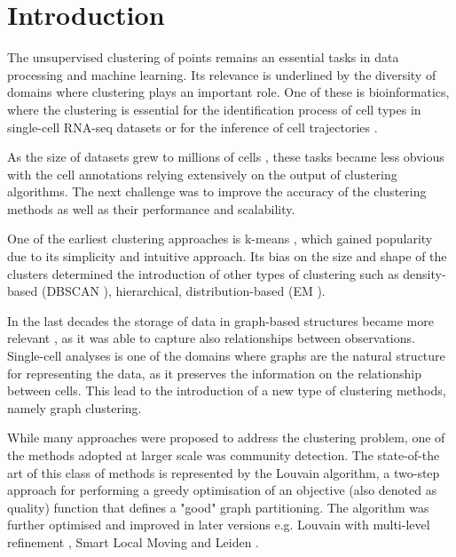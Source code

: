 \chapter*{Introduction} 

The unsupervised clustering of points remains an essential tasks in data processing and machine learning. Its relevance is underlined by the diversity of domains where clustering plays an important role. One of these is bioinformatics, where the clustering is essential for the identification process of cell types \cite{Kiselev2019a} in single-cell RNA-seq datasets or for the inference of cell trajectories \cite{Saelens2019}.

As the size of datasets grew to millions of cells \cite{Svensson2020a}, these tasks became less obvious with the cell annotations relying extensively on the output of clustering algorithms. The next challenge was to improve the accuracy of the clustering methods as well as their performance and scalability.

One of the earliest clustering approaches is k-means \cite{Lloyd1982}, which gained popularity due to its simplicity and intuitive approach. Its bias on the size and shape of the clusters determined the introduction of other types of clustering such as density-based (DBSCAN \cite{ester1996}), hierarchical, distribution-based (EM \cite{Dempster1977}).

In the last decades the storage of data in graph-based structures became more relevant \cite{cook2006mining}, as it was able to capture also relationships between observations. Single-cell analyses is one of the domains where graphs are the natural structure for representing the data, as it preserves the information on the relationship between cells. This lead to the introduction of a new type of clustering methods, namely graph clustering.

While many approaches were proposed to address the clustering problem, one of the methods adopted at larger scale was community detection. The state-of-the art of this class of methods is represented by the Louvain \cite{Blondel2008b} algorithm, a two-step approach for performing a greedy optimisation of an objective (also denoted as quality) function that defines a "good" graph partitioning. The algorithm was further optimised and improved in later versions e.g. Louvain with multi-level refinement \cite{Rotta2011}, Smart Local Moving \cite{Waltman2013} and Leiden \cite{Traag2019a}.


